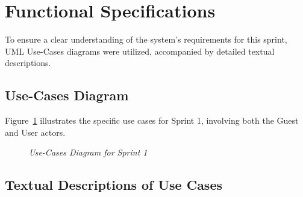 \section{Functional Specifications}
To ensure a clear understanding of the system's requirements for this sprint, UML Use-Cases diagrams were utilized, accompanied by detailed textual descriptions.

\subsection{Use-Cases Diagram}
Figure~\ref{fig:sprint1_usecase} illustrates the specific use cases for Sprint 1, involving both the Guest and User actors.

\begin{figure}[H]
    \centering
    \caption{\textit{Use-Cases Diagram for Sprint 1}}
    \label{fig:sprint1_usecase}
\end{figure}

\subsection{Textual Descriptions of Use Cases}

